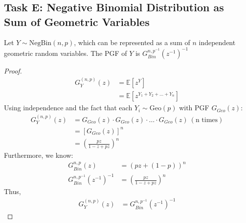 \subsection*{Task E: Negative Binomial Distribution as Sum of Geometric Variables}
\begin{claim}\label{clm:one-five}
	Let \(Y \sim \text{NegBin}(n, p)\), which can be represented as a sum of \(n\) independent geometric random variables. The PGF of \(Y\) is \(G_{Bin}^{n, p^{-1}}(z^{-1})^{-1}\)
\end{claim}
\begin{proof}
	\begin{align*}
		G_Y^{(n,p)}(z) & = \mathbb{E}[z^Y]                         \\
		               & = \mathbb{E}[z^{Y_1 + Y_2 + \dots + Y_n}]
	\end{align*}
	Using independence and the fact that each \(Y_i \sim \text{Geo}(p)\) with PGF \(G_{Geo}(z)\):
	\begin{align*}
		G_Y^{(n,p)}(z) & = G_{Geo}(z) \cdot G_{Geo}(z) \cdot \dots \cdot G_{Geo}(z) \ (\text{n times}) \\
		               & = [G_{Geo}(z)]^n                                                              \\
		               & = \left(\frac{pz}{1 - z + pz}\right)^n
	\end{align*}
	Furthermore, we know:
	\begin{align*}
		G_{Bin}^{n,p}(z)                 & = (pz + (1-p))^n                       \\
		G_{Bin}^{n, p^{-1}}(z^{-1})^{-1} & = \left(\frac{pz}{1 - z + pz}\right)^n
	\end{align*}
	Thus,
	\begin{align*}
		G_Y^{(n,p)}(z) & = G_{Bin}^{n, p^{-1}}(z^{-1})^{-1}
	\end{align*}
\end{proof}

